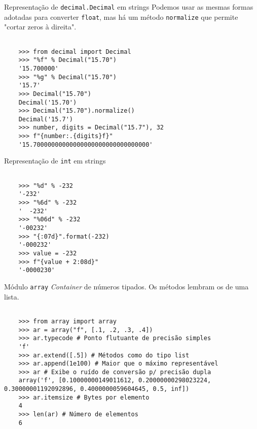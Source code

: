 \documentclass[utf8]{beamer}
\begin{document}
\begin{frame}[fragile]{Representação de \texttt{decimal.Decimal}
                       em strings}
  Podemos usar as mesmas formas adotadas
  para converter \texttt{float},
  mas há um método \texttt{normalize}
  que permite "cortar zeros à direita".

  \begin{verbatim}

    >>> from decimal import Decimal
    >>> "%f" % Decimal("15.70")
    '15.700000'
    >>> "%g" % Decimal("15.70")
    '15.7'
    >>> Decimal("15.70")
    Decimal('15.70')
    >>> Decimal("15.70").normalize()
    Decimal('15.7')
    >>> number, digits = Decimal("15.7"), 32
    >>> f"{number:.{digits}f}"
    '15.70000000000000000000000000000000'

  \end{verbatim}

\end{frame}


\begin{frame}[fragile]{Representação de \texttt{int} em strings}
  \begin{verbatim}

    >>> "%d" % -232
    '-232'
    >>> "%6d" % -232
    '  -232'
    >>> "%06d" % -232
    '-00232'
    >>> "{:07d}".format(-232)
    '-000232'
    >>> value = -232
    >>> f"{value + 2:08d}"
    '-0000230'

  \end{verbatim}
\end{frame}


\begin{frame}[fragile]{Módulo \texttt{array}}
  \emph{Container} de números tipados.
  Os métodos lembram os de uma lista.

  \begin{verbatim}

    >>> from array import array
    >>> ar = array("f", [.1, .2, .3, .4])
    >>> ar.typecode # Ponto flutuante de precisão simples
    'f'
    >>> ar.extend([.5]) # Métodos como do tipo list
    >>> ar.append(1e100) # Maior que o máximo representável
    >>> ar # Exibe o ruído de conversão p/ precisão dupla
    array('f', [0.10000000149011612, 0.20000000298023224, 0.30000001192092896, 0.4000000059604645, 0.5, inf])
    >>> ar.itemsize # Bytes por elemento
    4
    >>> len(ar) # Número de elementos
    6

  \end{verbatim}

\end{frame}
\end{document}

